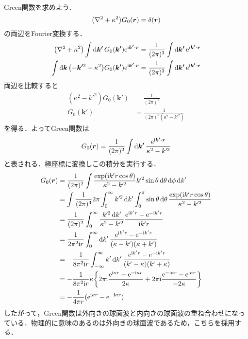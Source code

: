 \documentclass{report}
\begin{document}
  Green関数を求めよう．
  \begin{align}
    \qty(\nabla^2 + \kappa^2)G_0(\bm{r}) = \delta(\bm{r})
  \end{align}
  の両辺をFourier変換する．
  \begin{align}
    \qty(\nabla^2 + \kappa^2)\int \dd{\bm{k'}} G_0(\bm{k'}) \mathrm{e}^{\mathrm{i}\bm{k'}\cdot \bm{r}} &= \frac{1}{(2\pi)^3}\int \dd{\bm{k'}} \mathrm{e}^{\mathrm{i}\bm{k'}\cdot\bm{r}}\\
    \int \dd{\bm{k}} \qty(-\bm{k'}^2 + \kappa^2)G_0(\bm{k'}) \mathrm{e}^{\mathrm{i} \bm{k'}\cdot \bm{r}} &= \frac{1}{(2\pi)^3} \int \dd{\bm{k'}} \mathrm{e}^{\mathrm{i} \bm{k'}\cdot \bm{r}}
  \end{align}
  両辺を比較すると
  \begin{align}
    (\kappa^2 - k'^2)G_0(\bm{k'}) &= \frac{1}{(2\pi)^2}\\
    G_0(\bm{k'}) &= \frac{1}{(2\pi)^2 (\kappa^2 - k'^2)}
  \end{align}
  を得る．よってGreen関数は
  \begin{align}
    G_0(\bm{r}) = \frac{1}{(2\pi)^2}\int \dd{\bm{k'}} \frac{\mathrm{e}^{\mathrm{i}\bm{k'}\cdot\bm{r}}}{\kappa^2 - k'^2}
  \end{align}
  と表される．極座標に変換しこの積分を実行する．
  \begin{align}
    G_0(\bm{r}) &= \frac{1}{(2\pi)^2} \int \frac{\exp(\mathrm{i} k' r \cos \theta)}{\kappa^2 - k'^2}k'^2\sin\theta\dd{\theta}\dd{\phi}\dd{k'}\\
    &= \int \frac{1}{(2\pi)^3}2\pi \int_{0}^{\infty} k'^2 \dd{k'} \int_{0}^{\pi}\sin\theta\dd{\theta}\frac{\exp(\mathrm{i} k' r\cos\theta)}{\kappa^2 - k'^2}\\
    &= \frac{1}{(2\pi)^2} \int_{0}^{\infty} \frac{k'^2\dd{k'}}{\kappa^2 - k'^2}\frac{\mathrm{e}^{\mathrm{i} k'r} - \mathrm{e}^{-\mathrm{i} k'r}}{\mathrm{i} k'r}\\
    &= \frac{1}{2\pi^2\mathrm{i} r} \int_{0}^{\infty}\dd{k'} \frac{\mathrm{e}^{\mathrm{i} k'r} - \mathrm{e}^{-\mathrm{i} k'r}}{(\kappa - k')(\kappa + k')}\\
    &= -\frac{1}{8\pi^2\mathrm{i} r} \int_{-\infty}^{\infty} k' \dd{k'} \frac{\mathrm{e}^{\mathrm{i} k'r} - \mathrm{e}^{-\mathrm{i} k'r}}{(k' - \kappa)(k' + \kappa)}\\
    &= -\frac{1}{8\pi^2\mathrm{i} r} \kappa \qty{2\pi \mathrm{i}\frac{\mathrm{e}^{\mathrm{i}\kappa r} - \mathrm{e}^{-\mathrm{i}\kappa r}}{2 \kappa} + 2\pi \mathrm{i}\frac{\mathrm{e}^{- \mathrm{i}\kappa r} - \mathrm{e}^{\mathrm{i}\kappa r}}{-2 \kappa}}\\
    &= -\frac{1}{4\pi r}(\mathrm{e}^{\mathrm{i} \kappa r} - \mathrm{e}^{-\mathrm{i} \kappa r})
  \end{align}
  したがって，Green関数は外向きの球面波と内向きの球面波の重ね合わせになっている．物理的に意味のあるのは外向きの球面波であるため，こちらを採用する．
\end{document}
